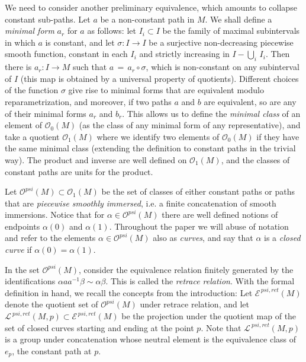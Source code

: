 \documentclass{amsart}
\newcommand{\I}{{\mathcal{O}}}
\begin{document}
We need to consider another preliminary equivalence, which amounts to collapse constant sub-paths. Let  $a$ be a non-constant path in $M$. We shall define a {\em minimal form} $a_r$ for $a$ as follows: let $I_i \subset I$ be the family of maximal subintervals in which
$a$ is constant, and let $\sigma: I \rightarrow I$ be a surjective non-decreasing piecewise smooth function, constant in each $I_i$ and strictly
increasing in $I - \bigcup_i\, I_i$. Then there is $a_r: I \rightarrow M$ such that $a\, =\,a_r \circ\sigma$, which is non-constant on any subinterval of $I$ (this map is obtained by a universal property of quotients). Different choices of the function $\sigma$ give rise to minimal forms that are equivalent modulo reparametrization, and moreover, if two paths $a$ and $b$ are equivalent, so are any of their minimal forms $a_r$ and $b_r$. This allows us to define the {\em minimal class} of an element of $\I_0(M)$ (as the class of any minimal form of any representative), and take a quotient $\I_1(M)$ where we identify two elements of $\I_0(M)$ if they have the same minimal class (extending the definition to constant paths in the trivial way). The product and inverse are well defined on $\I_1(M)$, and the classes of constant paths are units for the product.


Let $\I^{psi}(M)\subset \I_1(M)$ be the set of classes of either constant paths or paths that are {\em piecewise smoothly immersed}, i.e. a finite concatenation of smooth immersions.
Notice that for $\alpha\in \I^{psi}(M)$ there are well defined notions of endpoints $\alpha(0)$ and $\alpha(1)$. Throughout the paper we will abuse of notation and refer to the elements $\alpha \in \I^{psi}(M)$ also as {\em curves}, and say that $\alpha$ is a {\em closed curve} if $\alpha(0)=\alpha(1)$.


In the set $\I^{psi}(M)$, consider the equivalence
relation finitely generated by the identifications $\alpha aa^{-1}\beta\sim\alpha\beta$. This is called the \emph{retrace relation}. With the formal definition in hand, we recall the concepts from the introduction: Let ${\mathcal E}^{\,psi,ret}(M)$ denote the quotient set of $\I^{psi}(M)$ under retrace relation, and let ${\mathcal L}^{\ psi,ret}(M,p)\subset {\mathcal E}^{\,psi,ret}(M)$ be the projection under the quotient map of the set of closed curves starting and ending at the point $p$. Note that
${\mathcal L}^{\ psi,ret}(M,p)$ is a group under concatenation 
whose neutral element is the equivalence class of $e_p$,
the constant path at $p$.
\end{document}

